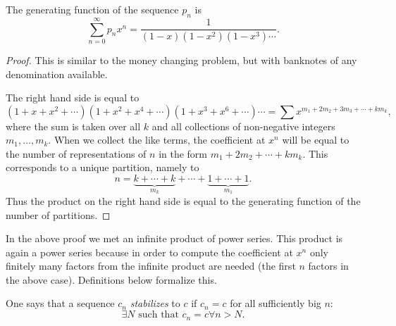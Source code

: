 \begin{page}
\setcounter{section}{3}
\setcounter{subsection}{4}
\setcounter{dfn}{5}
\label{portion:899}

\begin{thm}
The generating function of the sequence $p_n$ is
\[
\sum_{n=0}^\infty p_n x^n = \frac{1}{(1-x)(1-x^2)(1-x^3)\cdots}.
\]
\end{thm}

\end{page}

\begin{page}
\setcounter{section}{3}
\setcounter{subsection}{4}
\setcounter{dfn}{5}
\label{portion:900}

\begin{proof}
This is similar to the money changing problem, but with banknotes of any denomination available.

The right hand side is equal to
\[
(1+x+x^2+\cdots)(1+x^2+x^4+\cdots)(1+x^3+x^6+\cdots)\cdots = \sum x^{m_1 + 2m_2 + 3m_3 + \cdots + km_k},
\]
where the sum is taken over all $k$ and all collections of non-negative integers $m_1, \ldots, m_k$.
When we collect the like terms, the coefficient at $x^n$ will be equal to the number of representations of $n$ in the form
$m_1 + 2m_2 + \cdots + km_k$.
This corresponds to a unique partition, namely to
\[
n = \underbrace{k+\cdots+k}_{m_k} + \cdots + \underbrace{1+\cdots+1}_{m_1}.
\]
Thus the product on the right hand side is equal to the generating function of the number of partitions.
\end{proof}

In the above proof we met an infinite product of power series.
This product is again a power series because in order to compute the coefficient at $x^n$
only finitely many factors from the infinite product are needed (the first $n$ factors in the above case).
Definitions below formalize this.


\end{page}

\begin{page}
\setcounter{section}{3}
\setcounter{subsection}{4}
\setcounter{dfn}{6}
\label{portion:902}

\begin{dfn}
One says that a sequence $c_n$ \emph{stabilizes} to $c$ if $c_n = c$ for all sufficiently big $n$:
\[
\exists N \text{ such that } c_n = c \forall n > N.
\]
\end{dfn}

\end{page}

